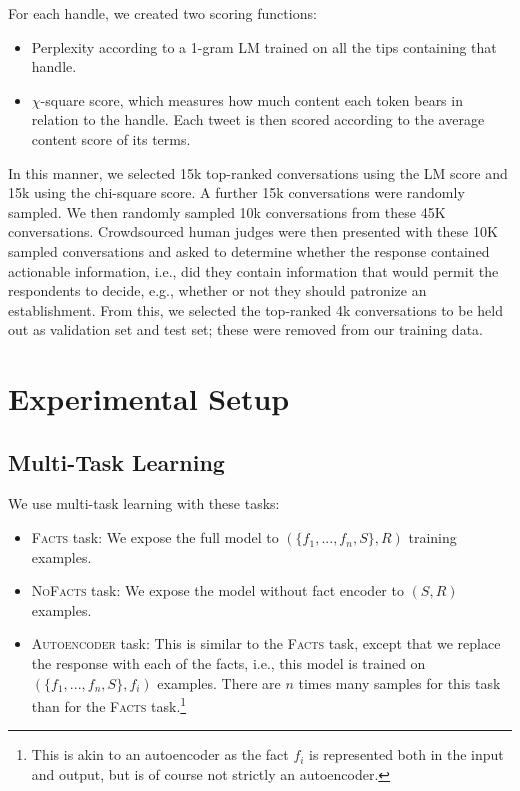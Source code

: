 \documentclass[letterpaper]{article}
\begin{document}
For each handle, we created two scoring functions: 
\begin{itemize}
\item{Perplexity according to a 1-gram LM trained on all the tips containing that handle.}
\item{$\chi$-square score, which measures how much content each token bears in relation to the handle. Each tweet is then scored according to the average content score of its terms.}
\end{itemize}
In this manner, we selected 15k top-ranked conversations using the LM score and 15k using the chi-square score.
A further 15k conversations were randomly sampled. 
We then randomly sampled 10k conversations from these 45K conversations.  
Crowdsourced human judges were then presented with these 10K sampled conversations and asked to determine whether the response contained actionable information, i.e., did they contain information that would permit the respondents to decide, e.g., whether or not they should patronize an establishment. 
From this, we selected the top-ranked 4k conversations to be held out as validation set and test set; these were removed from our training data.   

\section{Experimental Setup}

\subsection{Multi-Task Learning}

We use multi-task learning with these tasks:
\begin{itemize}
    \item \textsc{Facts} task: We expose the full model to $(\{f_1,...,f_n,S\},R)$ training examples.
    \item \textsc{NoFacts} task: We expose the model without fact encoder to $(S,R)$ examples.
    \item \textsc{Autoencoder} task: This is similar to the \textsc{Facts} task, except that we replace the response with each of the facts, i.e., this model is trained on $(\{f_1,...,f_n,S\},f_i)$ examples.
    There are $n$ times many samples for this task than for the \textsc{Facts} task.\footnote{This is akin to an autoencoder as the fact $f_i$ is represented both in the input and output, but is of course not strictly an autoencoder.}
\end{itemize}
\end{document}
